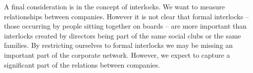 A final consideration is in the concept of interlocks. 
We want to measure relationships between companies. 
However it is not clear that formal interlocks -- those occurring by people sitting together on boards -- 
are more important than interlocks created by directors being part of the same social clubs or the same families. 
By restricting ourselves to formal interlocks we may be missing an important part of the corporate network. 
However, we expect to capture a significant part of the relations between companies.

 